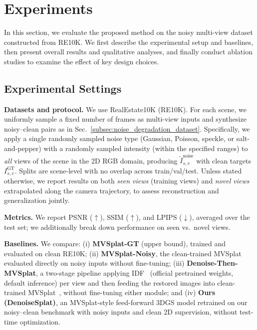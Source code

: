 \section{Experiments}
\label{sec:experiments}



In this section, we evaluate the proposed method on the noisy multi-view dataset constructed from RE10K. We first describe the experimental setup and baselines, then present overall results and qualitative analyses, and finally conduct ablation studies to examine the effect of key design choices.



\subsection{Experimental Settings}
\label{subsec:exp_settings}

\noindent \textbf{Datasets and protocol.}
We use RealEstate10K (RE10K). For each scene, we uniformly sample a fixed number of frames as multi-view inputs and synthesize noisy--clean pairs as in Sec.~\ref{subsec:noise_degradation_dataset}.
Specifically, we apply a single randomly sampled noise type (Gaussian, Poisson, speckle, or salt-and-pepper) with a randomly sampled intensity (within the specified ranges) to \emph{all} views of the scene in the 2D RGB domain, producing \(\tilde{I}^{\text{noise}}_{s,v}\) with clean targets \(I^{\text{GT}}_{s,v}\).
Splits are scene-level with no overlap across train/val/test.
Unless stated otherwise, we report results on both \emph{seen views} (training views) and \emph{novel views} extrapolated along the camera trajectory, to assess reconstruction and generalization jointly.

\noindent \textbf{Metrics.}
We report PSNR (\(\uparrow\)), SSIM (\(\uparrow\)), and LPIPS (\(\downarrow\)), averaged over the test set; we additionally break down performance on seen vs.\ novel views.

\noindent \textbf{Baselines.}
We compare: (i) \textbf{MVSplat-GT} (upper bound), trained and evaluated on clean RE10K; 
(ii) \textbf{MVSplat-Noisy}, the clean-trained MVSplat evaluated directly on noisy inputs without fine-tuning;
(iii) \textbf{Denoise-Then-MVSplat}, a two-stage pipeline applying IDF~\cite{kim2025idf} (official pretrained weights, default inference) per view and then feeding the restored images into clean-trained MVSplat~\cite{chen2024mvsplat}, without fine-tuning either module; and
(iv) \textbf{Ours (DenoiseSplat)}, an MVSplat-style feed-forward 3DGS model retrained on our noisy--clean benchmark with noisy inputs and clean 2D supervision, without test-time optimization.


